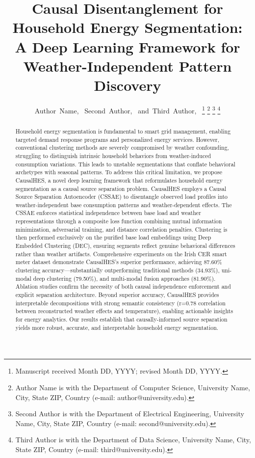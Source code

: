 \documentclass[journal]{IEEEtran}
\begin{document}
\title{Causal Disentanglement for Household Energy Segmentation: A Deep Learning Framework for Weather-Independent Pattern Discovery}

\author{Author~Name,~
        Second~Author,~
        and~Third~Author,~
\thanks{Manuscript received Month DD, YYYY; revised Month DD, YYYY.}
\thanks{Author Name is with the Department of Computer Science, University Name, City, State ZIP, Country (e-mail: author@university.edu).}%
\thanks{Second Author is with the Department of Electrical Engineering, University Name, City, State ZIP, Country (e-mail: second@university.edu).}%
\thanks{Third Author is with the Department of Data Science, University Name, City, State ZIP, Country (e-mail: third@university.edu).}}

\maketitle

\begin{abstract}
Household energy segmentation is fundamental to smart grid management, enabling targeted demand response programs and personalized energy services. However, conventional clustering methods are severely compromised by weather confounding, struggling to distinguish intrinsic household behaviors from weather-induced consumption variations. This leads to unstable segmentations that conflate behavioral archetypes with seasonal patterns. To address this critical limitation, we propose CausalHES, a novel deep learning framework that reformulates household energy segmentation as a causal source separation problem. CausalHES employs a Causal Source Separation Autoencoder (CSSAE) to disentangle observed load profiles into weather-independent base consumption patterns and weather-dependent effects. The CSSAE enforces statistical independence between base load and weather representations through a composite loss function combining mutual information minimization, adversarial training, and distance correlation penalties. Clustering is then performed exclusively on the purified base load embeddings using Deep Embedded Clustering (DEC), ensuring segments reflect genuine behavioral differences rather than weather artifacts. Comprehensive experiments on the Irish CER smart meter dataset demonstrate CausalHES's superior performance, achieving 87.60\% clustering accuracy—substantially outperforming traditional methods (34.93\%), uni-modal deep clustering (79.50\%), and multi-modal fusion approaches (81.90\%). Ablation studies confirm the necessity of both causal independence enforcement and explicit separation architecture. Beyond superior accuracy, CausalHES provides interpretable decompositions with strong semantic consistency (r=0.78 correlation between reconstructed weather effects and temperature), enabling actionable insights for energy analytics. Our results establish that causally-informed source separation yields more robust, accurate, and interpretable household energy segmentation.
\end{abstract}
\end{document}
